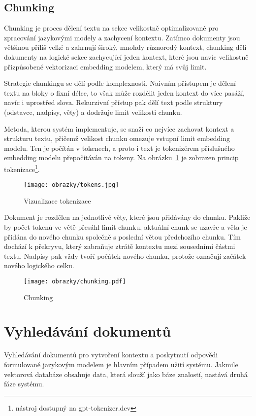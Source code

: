 \subsection{Chunking}
\label{chunking}
Chunking je proces dělení textu na sekce velikostně optimalizované pro zpracování jazykovými modely a zachycení kontextu. Zatímco dokumenty jsou většinou příliš velké a zahrnují široký, mnohdy různorodý kontext, chunking dělí dokumenty na logické sekce zachycující jeden kontext, které jsou navíc velikostně přizpůsobené vektorizaci embedding modelem, který má svůj limit.

Strategie chunkingu se dělí podle komplexnosti. Naivním přístupem je dělení textu na bloky o fixní délce, to však může rozdělit jeden kontext do více pasáží, navíc i uprostřed slova. Rekurzivní přístup pak dělí text podle struktury (odstavce, nadpisy, věty) a dodržuje limit velikosti chunku.

Metoda, kterou systém implementuje, se snaží co nejvíce zachovat kontext a strukturu textu, přičemž velikost chunku omezuje vstupní limit embedding modelu. Ten je počítán v tokenech, a proto i text je tokenizérem příslušného embedding modelu přepočítáván na tokeny. Na obrázku~\ref{fig:tokenizer} je zobrazen princip tokenizace\footnote{nástroj dostupný na gpt-tokenizer.dev}.

\begin{figure}[H]
    \centering
    \texttt{[image: obrazky/tokens.jpg]}
    \caption{Vizualizace tokenizace}
    \label{fig:tokenizer}
\end{figure}

Dokument je rozdělen na jednotlivé věty, které jsou přidávány do chunku. Pakliže by počet tokenů ve větě přesáhl limit chunku, aktuální chunk se uzavře a věta je přidána do nového chunku společně s poslední větou předchozího chunku. Tím dochází k překryvu, který zabraňuje ztrátě kontextu mezi sousedními částmi textu. Nadpisy pak vždy tvoří počátek nového chunku, protože označují začátek nového logického celku.

\begin{figure}[H]
    \centering
    \texttt{[image: obrazky/chunking.pdf]}
    \caption{Chunking}
    \label{fig:chunking}
\end{figure}


\section{Vyhledávání dokumentů}
Vyhledávání dokumentů pro vytvoření kontextu a poskytnutí odpovědi formulované jazykovým modelem je hlavním případem užití systému. Jakmile vektorová databáze obsahuje data, která slouží jako báze znalostí, nastává druhá fáze systému. 

